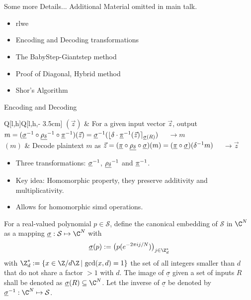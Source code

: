 \appendix
\section{\appendixname}
\begin{frame}{Some more Details...}
  Additional Material omitted in main talk.

  \begin{itemize}
    \item \glsdesc{rlwe}
    \item Encoding and Decoding transformations
    \item The BabyStep-Giantstep method
    \item Proof of Diagonal, Hybrid method
    \item Shor's Algorithm
  \end{itemize}
\end{frame}

\begin{frame}{Encoding and Decoding}
   \\
  \begin{tblr}{Q[l,h]Q[l,h,\textwidth - 3.5cm]}
    $(\vec{z})$ & {For a given input vector $\vec{z}$, output
        $m = (\underline{\sigma}^{-1} \circ \underline{\rho_\delta}^{-1} \circ \underline{\pi}^{-1})(\vec{z}) = \underline{\sigma}^{-1}(\lfloor \delta \cdot \underline{\pi}^{-1}(\vec{z})\rceil_{\underline{\sigma}(R)})$ $\quad\rightarrow m$} \\
    $(m)$ & {Decode plaintext $m$ as
        $\vec{z} = (\underline{\pi} \circ \underline{\rho_\delta} \circ \underline{\sigma})(m) = (\underline{\pi} \circ \underline{\sigma})(\delta^{-1} m)$
        $\quad\rightarrow \vec{z}$} \\
  \end{tblr}
  \begin{itemize}
    \item Three transformations: $\underline{\sigma}^{-1}$, $\underline{\rho_\delta}^{-1}$ and $\underline{\pi}^{-1}$.
    \item Key idea: Homomorphic property, they preserve additivity and multiplicativity.
    \item Allows for homomorphic \gls{simd} operations.
  \end{itemize}
\end{frame}

\begin{frame}[c]
  \begin{definition}
    For a real-valued polynomial $p \in \mathcal{S}$, define the canonical embedding of $\mathcal{S}$ in $\C^N$ as a mapping $\underline{\sigma}: \mathcal{S} \mapsto \C^N$ with $$\underline{\sigma}(p) := \big(p(e^{-2\pi i j / N})\big)_{j \in \Z_d^*}$$ with $\Z_d^* := \{x \in \Z / d\Z \,|\, \gcd(x, d) = 1\}$ the set of all integers smaller than $d$ that do not share a factor $> 1$ with $d$.
    The image of $\underline{\sigma}$ given a set of inputs $R$ shall be denoted as $\underline{\sigma}(R) \subseteq \C^N$.
    Let the inverse of $\underline{\sigma}$ be denoted by $\underline{\sigma}\inv: \C^N \mapsto \mathcal{S}$.
  \end{definition}
\end{frame}

